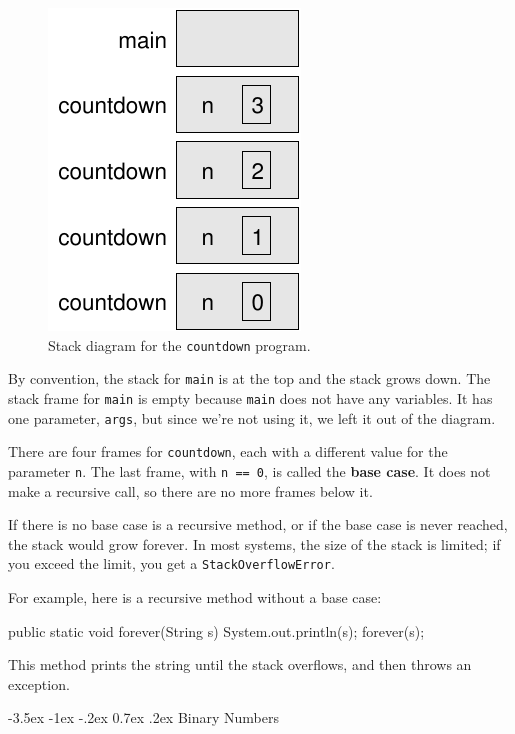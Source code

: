\documentclass[12pt]{book}
\makeatletter
\theoremstyle{exercise}
\newcommand{\java}[1]{\verb"#1"}
\renewcommand{\section}{\@startsection{section}{1}{\z@}%
    {-3.5ex \@plus -1ex \@minus -.2ex}%
    {0.7ex \@plus.2ex}%
    {\normalfont\Large\bfseries}}
\newcommand{\java}[1]{\lstinline{#1}} %
\makeatother
\begin{document}
\begin{figure}[!h]
\begin{center}
\includegraphics{figs/stack2.pdf}
\caption{Stack diagram for the \java{countdown} program.}
\end{center}
\end{figure}

By convention, the stack for \java{main} is at the top and the stack grows down.
The stack frame for \java{main} is empty because \java{main} does not have any variables.
It has one parameter, \java{args}, but since we're not using it, we left it out of the diagram.

There are four frames for \java{countdown}, each with a different value for the parameter \java{n}.
The last frame, with \java{n == 0}, is called the {\bf base case}.
It does not make a recursive call, so there are no more frames below it.

If there is no base case is a recursive method, or if the base case is never reached, the stack would grow forever.
In most systems, the size of the stack is limited; if you exceed the limit, you get a \java{StackOverflowError}.

For example, here is a recursive method without a base case:

\begin{code}
    public static void forever(String s) {
        System.out.println(s);
        forever(s);
    }
\end{code}


This method prints the string until the stack overflows, and then throws an exception.


\section{Binary Numbers}
\end{document}
